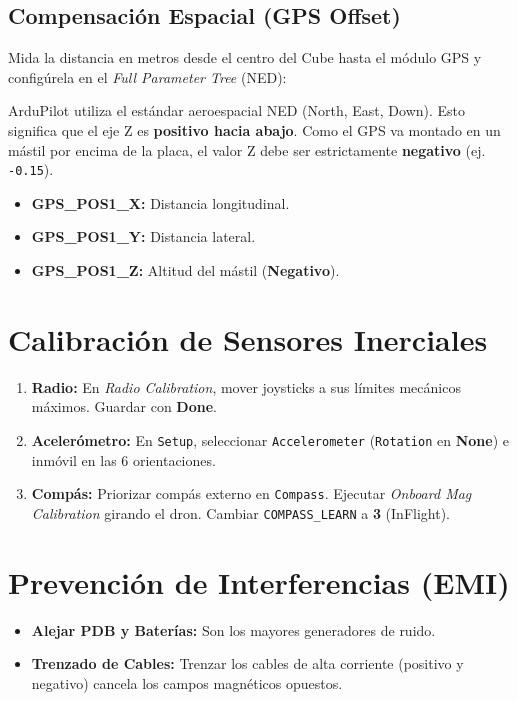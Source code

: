 \documentclass[11pt,a4paper]{article}
\begin{document}
\subsection{Compensación Espacial (GPS Offset)}
Mida la distancia en metros desde el centro del Cube hasta el módulo GPS y configúrela en el \textit{Full Parameter Tree} (NED):

\begin{warningbox}[title=La Trampa del Eje Z (NED)]
ArduPilot utiliza el estándar aeroespacial NED (North, East, Down). Esto significa que el eje Z es \textbf{positivo hacia abajo}. Como el GPS va montado en un mástil por encima de la placa, el valor Z debe ser estrictamente \textbf{negativo} (ej. \texttt{-0.15}).
\end{warningbox}

\begin{itemize}[leftmargin=*,noitemsep]
    \item \textbf{GPS\_POS1\_X:} Distancia longitudinal.
    \item \textbf{GPS\_POS1\_Y:} Distancia lateral.
    \item \textbf{GPS\_POS1\_Z:} Altitud del mástil (\textbf{Negativo}).
\end{itemize}

\section{Calibración de Sensores Inerciales}
\begin{enumerate}[leftmargin=*,noitemsep]
    \item \textbf{Radio:} En \textit{Radio Calibration}, mover joysticks a sus límites mecánicos máximos. Guardar con \textbf{Done}.
    \item \textbf{Acelerómetro:} En \texttt{Setup}, seleccionar \texttt{Accelerometer} (\texttt{Rotation} en \textbf{None}) e inmóvil en las 6 orientaciones.
    \item \textbf{Compás:} Priorizar compás externo en \texttt{Compass}. Ejecutar \textit{Onboard Mag Calibration} girando el dron. Cambiar \texttt{COMPASS\_LEARN} a \textbf{3} (InFlight).
\end{enumerate}

\section{Prevención de Interferencias (EMI)}
\begin{itemize}[leftmargin=*,noitemsep]
    \item \textbf{Alejar PDB y Baterías:} Son los mayores generadores de ruido.
    \item \textbf{Trenzado de Cables:} Trenzar los cables de alta corriente (positivo y negativo) cancela los campos magnéticos opuestos.
\end{itemize}
\end{document}
